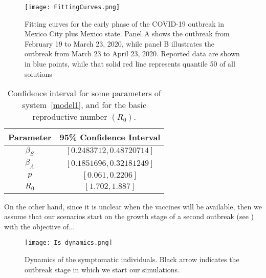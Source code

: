 \begin{figure}[!h]
    \texttt{[image: FittingCurves.png]}
    \caption{Fitting curves for the early
    phase of the COVID-19 outbreak in Mexico
    City plus Mexico state. Panel A shows the
    outbreak from February 19 to March 23,
    2020, while panel B illustrates the
    outbreak from March 23 to April 23, 2020.
    Reported data are shown in blue points,
    while that solid red line represents
    quantile 50 of all solutions}
    \label{Fig:fittingcurve}
\end{figure}
%
\begin{table}[h!]
    \begin{center}
        \begin{tabular}{cc}
            \toprule
            Parameter & 95\% Confidence
            Interval
            \\
            \midrule
            $\beta_S$ & $[0.2483712,
            0.48720714]$ \\
            $\beta_A$ & $[0.1851696,
            0.32181249]$ \\
            $p$       & $[0.061, 0.2206]$ \\
            $R_0$     & $[1.702, 1.887]$\\
            \bottomrule
        \end{tabular}
        \caption{Confidence interval for some
        parameters of system~\eqref{model1},
        and for the basic reproductive number
        $(R_0)$.}\label{table_icparam4}
    \end{center}
\end{table}

On the other hand, since it is unclear when
the vaccines will be available, then we
assume that our scenarios start on the growth
stage of a second outbreak (see
) with the
objective of...
\begin{figure}[!h]
    \texttt{[image: Is\_dynamics.png]}
    \caption{Dynamics of the symptomatic
    individuals. Black arrow indicates the
    outbreak stage in which we start our
    simulations.}
    \label{Fig:initial_conditions}
\end{figure}


